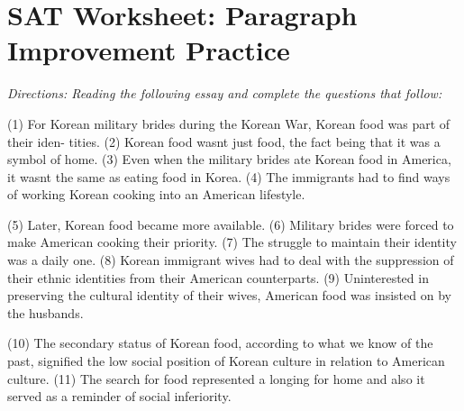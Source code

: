 \section{SAT Worksheet: Paragraph Improvement Practice}

\textit{Directions: Reading the following essay and complete the questions that follow:}

\bigskip
\indent (1) For Korean military brides during the Korean War, Korean food was part of their iden-
tities. (2) Korean food wasnt just food, the fact being that it was a symbol of home. (3) Even
when the military brides ate Korean food in America, it wasnt the same as eating food in Korea.
(4) The immigrants had to find ways of working Korean cooking into an American lifestyle.


\indent (5) Later, Korean food became more available. (6) Military brides were forced to make
American cooking their priority. (7) The struggle to maintain their identity was a daily one.
(8) Korean immigrant wives had to deal with the suppression of their ethnic identities from
their American counterparts. (9) Uninterested in preserving the cultural identity of their wives,
American food was insisted on by the husbands.


\indent (10) The secondary status of Korean food, according to what we know of the past, signified
the low social position of Korean culture in relation to American culture. (11) The search for food
represented a longing for home and also it served as a reminder of social inferiority.

